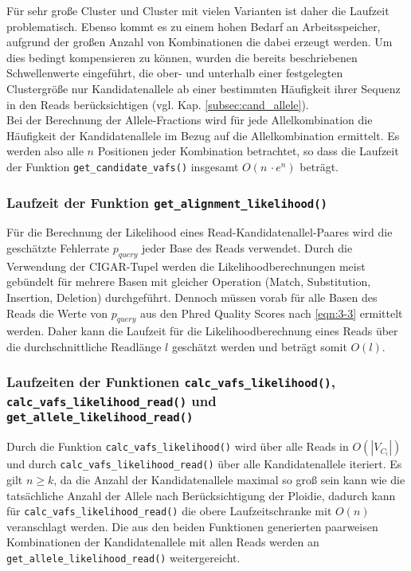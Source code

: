 Für sehr große Cluster und Cluster mit vielen Varianten ist daher die Laufzeit problematisch. Ebenso kommt es zu einem hohen Bedarf an Arbeitsspeicher, aufgrund der großen Anzahl von Kombinationen die dabei erzeugt werden. Um dies bedingt kompensieren zu können, wurden die bereits beschriebenen Schwellenwerte eingeführt, die ober- und unterhalb einer festgelegten Clustergröße nur Kandidatenallele ab einer bestimmten Häufigkeit ihrer Sequenz in den Reads berücksichtigen (vgl. Kap. \ref{subsec:cand_allele}).\\

Bei der Berechnung der Allele-Fractions wird für jede Allelkombination die Häufigkeit der Kandidatenallele im Bezug auf die Allelkombination ermittelt. Es werden also alle $n$ Positionen jeder Kombination betrachtet, so dass die Laufzeit der Funktion \lstinline|get_candidate_vafs()| insgesamt $ O(n\, \cdotp e^n)$ beträgt. 

\subsubsection{Laufzeit der Funktion \lstinline|get_alignment_likelihood()|}

Für die Berechnung der Likelihood eines Read-Kandidatenallel-Paares wird die geschätzte Fehlerrate $ p_{query} $ jeder Base des Reads verwendet. Durch die Verwendung der CIGAR-Tupel werden die Likelihoodberechnungen meist gebündelt für mehrere Basen mit gleicher Operation (Match, Substitution, Insertion, Deletion) durchgeführt. Dennoch müssen vorab für alle Basen des Reads die Werte von $ p_{query} $ aus den Phred Quality Scores nach \eqref{eqn:3-3} ermittelt werden. Daher kann die Laufzeit für die Likelihoodberechnung eines Reads über die durchschnittliche Readlänge $ l $ geschätzt werden und beträgt somit $O(l)$.


\subsubsection{Laufzeiten der Funktionen \lstinline|calc_vafs_likelihood()|, \lstinline|calc_vafs_likelihood_read()| und \lstinline|get_allele_likelihood_read()|}

Durch die Funktion \lstinline|calc_vafs_likelihood()| wird über alle Reads in $ O(|V_{C_{i}}|) $ und durch \lstinline|calc_vafs_likelihood_read()| über alle Kandidatenallele iteriert. Es gilt $n \geq k$, da die Anzahl der Kandidatenallele maximal so groß sein kann wie die tatsächliche Anzahl der Allele nach Berücksichtigung der Ploidie, dadurch kann für \lstinline|calc_vafs_likelihood_read()| die obere Laufzeitschranke mit $ O(n) $ veranschlagt werden. Die aus den beiden Funktionen generierten paarweisen Kombinationen der Kandidatenallele mit allen Reads werden an \linebreak \lstinline|get_allele_likelihood_read()| weitergereicht.\\

